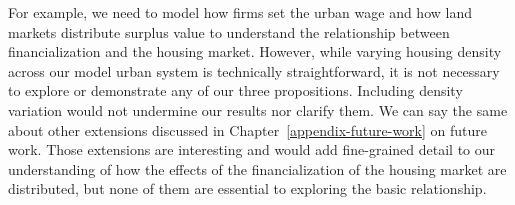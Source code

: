 For example, we need to model how firms set the urban wage and how land markets distribute surplus value to understand the relationship between financialization and the housing market. %
However, while varying housing density across our model urban system is technically straightforward, it is not necessary to explore or demonstrate any of our three propositions. Including density variation would not undermine our results nor clarify them. %
We can say the same about other extensions discussed in Chapter~\ref{appendix-future-work} on future work. %
Those extensions are interesting and would add fine-grained detail to our understanding of how the effects of the financialization of the housing market are distributed, but none of them are essential to exploring the basic relationship. %

